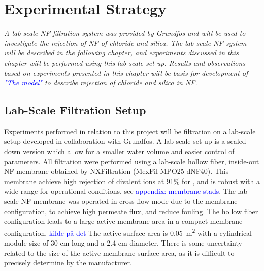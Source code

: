 \chapter{Experimental Strategy }


\textit{%
A lab-scale NF filtration system was provided by Grundfos and will be used to investigate the rejection of NF of chloride and silica. 
The lab-scale NF system will be described in the following chapter, and experiments discussed in this chapter will be performed using this lab-scale set up. 
Results and observations based on experiments presented in this chapter will be basis for development of \textcolor{blue}{"The model"} to describe rejection of chloride and silica in NF.
}


\section{Lab-Scale Filtration Setup}

Experiments performed in relation to this project will be  filtration on a lab-scale setup developed in collaboration with Grundfos. 
A lab-scale set up is a scaled down version which allow for a smaller water volume and easier control of parameters. 
All filtration were performed using a lab-scale hollow fiber, inside-out NF membrane obtained by NXFiltration (MexFil MPO25 dNF40). 
This membrane achieve high rejection of divalent ions at 91\% for , and is robust with a wide range for operational conditions, see \textcolor{blue}{appendix: membrane stads}. 
The lab-scale NF membrane was operated in cross-flow mode due to the membrane configuration, to achieve high permeate flux, and reduce fouling. 
The hollow fiber configuration leads to a large active membrane area in a compact membrane configuration. \textcolor{blue}{kilde på det}
The active surface area is \SI{0.05}{\square\meter} with a cylindrical module size of 30 cm long and a 2.4 cm diameter. 
There is some uncertainty related to the size of the active membrane surface area, as it is difficult to precisely determine by the manufacturer.  \citep{Datasheet_dNF40_labscale_2019}


